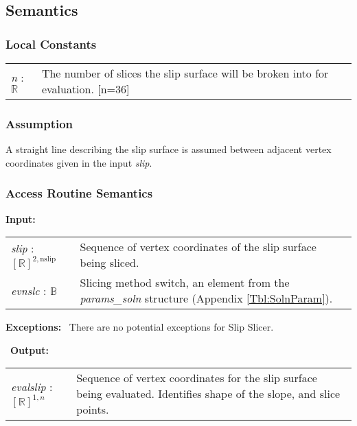 \documentclass[12pt, titlepage]{article}
\begin{document}
\subsection{Semantics}

\subsubsection{Local Constants}
\renewcommand*{\arraystretch}{1.5}
\begin{longtable}{p{} p{}}
  \textit{n} : $\mathbb{R}$ & The number of slices the slip surface
  will be broken into for evaluation. [n=36]\\
\end{longtable}

\subsubsection{Assumption}
A straight line describing the slip surface is assumed between
adjacent vertex coordinates given in the input \textit{slip}.

\subsubsection{Access Routine Semantics}
\textbf{Input:} 
\renewcommand*{\arraystretch}{1.5}
\begin{longtable}{p{} p{}}
  \textit{slip} : $[\mathbb{R}]^{2,\text{nslip}}$ & Sequence of vertex
  coordinates of the slip surface being sliced. \\

  \textit{evnslc} : $\mathbb{B}$ & Slicing method switch, an element
  from the \textit{params\_soln} structure (Appendix
  \ref{Tbl:SolnParam}).\\
\end{longtable}

\noindent \textbf{Exceptions:} ~\newline\noindent There are no
potential exceptions for Slip Slicer.

~\newline\noindent \textbf{Output:}
\renewcommand*{\arraystretch}{1.5}
\begin{longtable}{p{} p{}}
  \textit{evalslip} : $[\mathbb{R}]^{1,n}$ & Sequence of vertex
  coordinates for the slip surface being evaluated. Identifies shape
  of the slope, and slice points. \\
\end{longtable}
\end{document}
